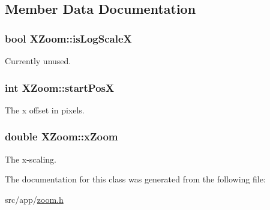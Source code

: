 \subsection{Member Data Documentation}
\hypertarget{classXZoom_a8d63712f3a4c68497a82b4667221ec69}{
\subsubsection[{isLogScaleX}]{\setlength{\rightskip}{0pt plus 5cm}bool {\bf XZoom::isLogScaleX}}}
\label{classXZoom_a8d63712f3a4c68497a82b4667221ec69}
Currently unused. \hypertarget{classXZoom_a0417c9b15b4a317cd3cd67a43dd77d54}{
\subsubsection[{startPosX}]{\setlength{\rightskip}{0pt plus 5cm}int {\bf XZoom::startPosX}}}
\label{classXZoom_a0417c9b15b4a317cd3cd67a43dd77d54}
The x offset in pixels. \hypertarget{classXZoom_a3317bfee8a039b7e8dcf1bfa0346ed32}{
\subsubsection[{xZoom}]{\setlength{\rightskip}{0pt plus 5cm}double {\bf XZoom::xZoom}}}
\label{classXZoom_a3317bfee8a039b7e8dcf1bfa0346ed32}
The x-\/scaling. 

The documentation for this class was generated from the following file:\begin{DoxyCompactItemize}
\item 
src/app/\hyperlink{zoom_8h}{zoom.h}\end{DoxyCompactItemize}
